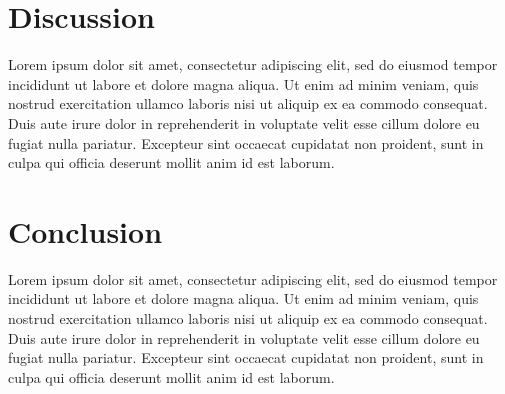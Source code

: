 \documentclass[preprint, 3p, authoryear]{elsarticle} %
\begin{document}
\hypertarget{discussion}{%
\section{Discussion}\label{discussion}}

Lorem ipsum dolor sit amet, consectetur adipiscing elit, sed do eiusmod tempor incididunt ut labore et dolore magna aliqua. Ut enim ad minim veniam, quis nostrud exercitation ullamco laboris nisi ut aliquip ex ea commodo consequat. Duis aute irure dolor in reprehenderit in voluptate velit esse cillum dolore eu fugiat nulla pariatur. Excepteur sint occaecat cupidatat non proident, sunt in culpa qui officia deserunt mollit anim id est laborum.

\hypertarget{conclusion}{%
\section{Conclusion}\label{conclusion}}

Lorem ipsum dolor sit amet, consectetur adipiscing elit, sed do eiusmod tempor incididunt ut labore et dolore magna aliqua. Ut enim ad minim veniam, quis nostrud exercitation ullamco laboris nisi ut aliquip ex ea commodo consequat. Duis aute irure dolor in reprehenderit in voluptate velit esse cillum dolore eu fugiat nulla pariatur. Excepteur sint occaecat cupidatat non proident, sunt in culpa qui officia deserunt mollit anim id est laborum.

\renewcommand\refname{References}

\end{document}
